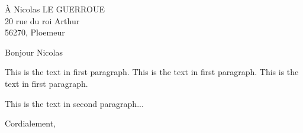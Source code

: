 \documentclass[12pt]{lettre}
\makeatletter
\newcommand{\NoRule}{\renewcommand*{\rule@length}{0}}
\makeatother
\begin{document}
   \begin{letter}{À Nicolas LE GUERROUE\\20 rue du roi Arthur\\
               56270, Ploemeur
                  }
   \date{le 07 janvier 2021}
      
      \NoRule
      \nodate
      \nolieu%
      \address{Nicolas Le Guerroué\\20 rue du roi Arthur\\
               56270, Ploemeur}
      \nofax
      \opening{Bonjour Nicolas}
      
      
      This is the text in first paragraph. This is the text in first 
paragraph. This is the text in first paragraph. \par
This is the text in second paragraph...

      
      \closing{Cordialement, }
     
   \end{letter}
   
   
   
\end{document}
